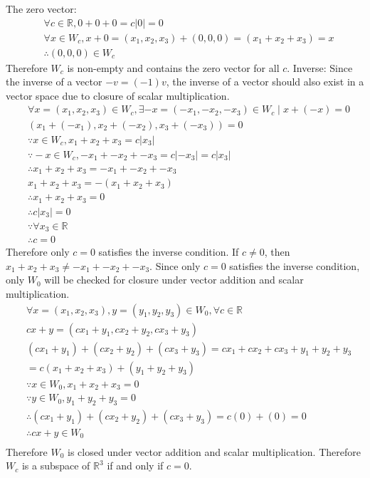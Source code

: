 \documentclass[10pt]{article}
\begin{document}
{{	The zero vector: 
	\begin{align*}
		&\forall c \in \mathbb R, 0 + 0 + 0 = c|0| = 0\\
		&\forall x \in W_c, x + 0 = (x_1, x_2, x_3) + (0,0,0) = (x_1 + x_2 + x_3) = x\\
		&\therefore (0, 0, 0) \in W_c
	\end{align*}
	Therefore $W_c$ is non-empty and contains the zero vector for all $c$.
	\newline
	\newline
	Inverse: Since the inverse of a vector $-v = (-1)v$, the inverse of a vector 
	should also exist in a vector space due to closure of scalar multiplication.
	\begin{align*}
		&\forall x = (x_1, x_2, x_3) \in W_c, \exists -x = (-x_1, -x_2, -x_3) \in W_c \mid x + (-x) = 0\\
		&(x_1 + (-x_1), x_2 + (-x_2), x_3 + (-x_3)) = 0\\
		&\because x \in W_c, x_1 + x_2 + x_3 = c|x_3|\\
		&\because -x \in W_c, -x_1 + -x_2 + -x_3 = c|-x_3| = c|x_3|\\
		&\therefore x_1 + x_2 + x_3 = -x_1 + -x_2 + -x_3\\
		&x_1 + x_2 + x_3 = -(x_1 + x_2 + x_3)\\
		&\therefore x_1 + x_2 + x_3 = 0\\
		&\therefore c|x_3| = 0\\
		&\because \forall x_3 \in \mathbb R\\
		&\therefore c = 0
	\end{align*}
	Therefore only $c = 0$ satisfies the inverse condition. If $c \neq 0$, then $x_1 + x_2 + x_3 \neq -x_1 + -x_2 + -x_3$.
	\newline
	\newline
	Since only $c = 0$ satisfies the inverse condition, only $W_0$ will be checked for
	closure under vector addition and scalar multiplication.
	\begin{align*}
		&\forall x = (x_1, x_2, x_3), y = (y_1, y_2, y_3) \in W_0, \forall c \in \mathbb R\\
		&cx + y = (cx_1 + y_1, cx_2 + y_2, cx_3 + y_3)\\
		&(cx_1 + y_1) + (cx_2 + y_2) + (cx_3 + y_3) = cx_1 + cx_2 + cx_3 + y_1 + y_2 + y_3\\
		&= c(x_1 + x_2 + x_3) + (y_1 + y_2 + y_3)\\
		&\because x \in W_0, x_1 + x_2 + x_3 = 0\\
		&\because y \in W_0, y_1 + y_2 + y_3 = 0\\
		&\therefore (cx_1 + y_1) + (cx_2 + y_2) + (cx_3 + y_3) = c(0) + (0) = 0\\
		&\therefore cx + y \in W_0\\
	\end{align*}
	Therefore $W_0$ is closed under vector addition and scalar multiplication.
	\newline
	\newline
	Therefore $W_c$ is a subspace of $\mathbb R^3$ if and only if $c = 0$.
	}
}
\end{document}
